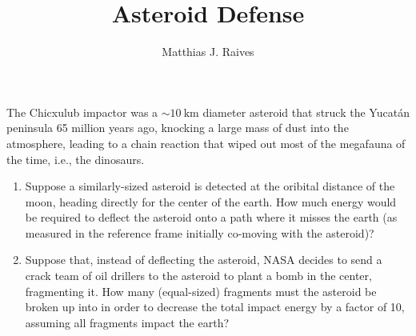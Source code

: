 \documentclass{article}
\title{Asteroid Defense}
\author{Matthias J. Raives}
\begin{document}
    
    \maketitle{}
    
    The Chicxulub impactor was a $\sim\SI{10}{\km}$ diameter asteroid that struck the Yucat\'an peninsula 65 million years ago, knocking a large mass of dust into the atmosphere, leading to a chain reaction that wiped out most of the megafauna of the time, i.e., the dinosaurs.
    
    \begin{enumerate}
        
        \item Suppose a similarly-sized asteroid is detected at the oribital distance of the moon, heading directly for the center of the earth.  How much energy would be required to deflect the asteroid onto a path where it misses the earth (as measured in the reference frame initially co-moving with the asteroid)?
        
        \item Suppose that, instead of deflecting the asteroid, NASA decides to send a crack team of oil drillers to the asteroid to plant a bomb in the center, fragmenting it.  How many (equal-sized) fragments must the asteroid be broken up into in order to decrease the total impact energy by a factor of 10, assuming all fragments impact the earth?
        
    \end{enumerate}
    
\end{document}
